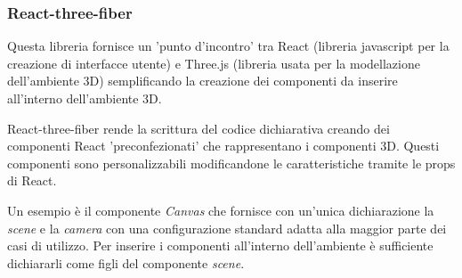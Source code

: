 \subsubsection{React-three-fiber}
Questa libreria fornisce un 'punto d'incontro' tra React (libreria javascript per la creazione di interfacce utente) e Three.js (libreria usata per
la modellazione dell'ambiente 3D) semplificando la creazione dei componenti da inserire all'interno dell'ambiente 3D.

React-three-fiber rende la scrittura del codice dichiarativa creando dei componenti React 'preconfezionati' che rappresentano i componenti 3D.
Questi componenti sono personalizzabili modificandone le caratteristiche tramite le props di React.

Un esempio è il componente \textit{Canvas} che fornisce con un'unica dichiarazione la \textit{scene} e la \textit{camera} con una configurazione standard 
adatta alla maggior parte dei casi di utilizzo. Per inserire i componenti all'interno dell'ambiente è sufficiente dichiararli come figli del 
componente \textit{scene}.
